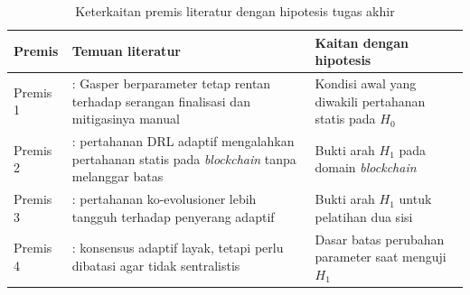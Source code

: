 \begin{table}[htbp]
\centering
\caption{Keterkaitan premis literatur dengan hipotesis tugas akhir}
\label{tab:hypothesis_basis}
\small
\begin{tabular}{|p{1.6cm}|p{7.4cm}|p{4.5cm}|}
\hline
\textbf{Premis} & \textbf{Temuan literatur} & \textbf{Kaitan dengan hipotesis} \\
\hline
Premis 1 & \textcite{laneve2025stochastic}: Gasper berparameter tetap rentan terhadap serangan finalisasi dan mitigasinya manual & Kondisi awal yang diwakili pertahanan statis pada $H_0$ \\
\hline
Premis 2 & \textcite{skowronski2026adaptive}: pertahanan DRL adaptif mengalahkan pertahanan statis pada \textit{blockchain} tanpa melanggar batas & Bukti arah $H_1$ pada domain \textit{blockchain} \\
\hline
Premis 3 & \textcite{wushishi2026coadam}: pertahanan ko-evolusioner lebih tangguh terhadap penyerang adaptif & Bukti arah $H_1$ untuk pelatihan dua sisi \\
\hline
Premis 4 & \textcite{rizal2025enhancing}: konsensus adaptif layak, tetapi perlu dibatasi agar tidak sentralistis & Dasar batas perubahan parameter saat menguji $H_1$ \\
\hline
\end{tabular}
\end{table}

